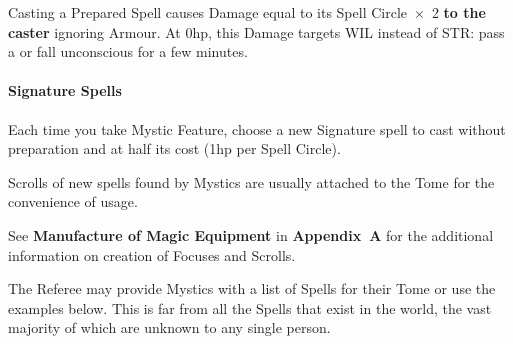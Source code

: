 \documentclass[itdr]{subfiles}
\begin{document}
Casting a Prepared Spell causes Damage equal to its Spell Circle~$\times$~2 \textbf{to the caster} ignoring Armour. At 0hp, this Damage targets WIL instead of STR: pass a  or fall unconscious for a few minutes.

\vfill
{}
\paragraph{Signature Spells}
Each time you take Mystic Feature, choose a new Signature spell to cast without preparation and at half its cost (1hp per Spell Circle).\\
\begin{dbox}
	Scrolls of new spells found by Mystics are usually attached to the Tome for the convenience of usage.
	
	See \textbf{Manufacture of Magic Equipment} in \mbox{\textbf{Appendix A}} for the additional information on creation of Focuses and Scrolls.
\end{dbox}

\vfill
\break

The Referee may provide Mystics with a list of Spells for their Tome or use the examples below. This is far from all the Spells that exist in the world, the vast majority of which are unknown to any single person.
\end{document}
